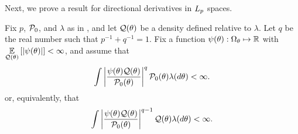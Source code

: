 Next, we prove a result for directional derivatives in ${L_{p}}$ spaces.


\begin{assu}
%
Fix $p$, $\mathcal{P}_{0}$, and $\lambda$ as in , and let
$\mathcal{Q}(\theta)$ be a density defined relative to $\lambda$.  Let $q$ be the real
number such that $p^{-1} + q^{-1} = 1$.  Fix a function $\psi(\theta): \Omega_{\theta}
\mapsto \mathbb{R}$ with $\underset{\mathcal{Q}(\theta)}{\mathbb{E}}\left[\left|\psi(\theta)\right|\right] < \infty$, and
assume that
%
\begin{align*}
%
\int \abs{\frac{\psi(\theta) \q(\theta)}{\pbase(\theta)}}^q
\pbase(\theta) \lambda(d\theta) < \infty.
%
\end{align*}
%
or, equivalently, that
%
\begin{align*}
%
\int \abs{\frac{\psi(\theta) \q(\theta)}{\pbase(\theta)}}^{q-1}
    \q(\theta) \lambda(d\theta)
< \infty.
%
\end{align*}
%
\end{assu}


